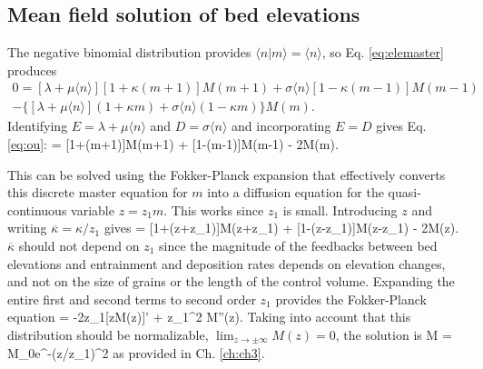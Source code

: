 \subsection{Mean field solution of bed elevations}
\label{sec:drr}
The negative binomial distribution provides $\langle n |m \rangle = \langle n \rangle$, so Eq. \ref{eq:elemaster} produces
\begin{multline} 0 = [\lambda + \mu \langle n \rangle][1+\kappa(m+1)]M(m+1) + \sigma \langle n \rangle [1-\kappa(m-1)]M(m-1) \\- \{[\lambda + \mu \langle n \rangle](1+\kappa m) + \sigma \langle n \rangle (1-\kappa m) \}M(m). \end{multline}
Identifying $E=\lambda + \mu \langle n \rangle$ and $D = \sigma \langle n \rangle$ and incorporating $E=D$ gives Eq. \ref{eq:ou}:
 = [1+\kappa(m+1)]M(m+1) + [1-\kappa(m-1)]M(m-1) - 2M(m).\ee

This can be solved using the Fokker-Planck expansion \citep{Gardiner1983} that effectively converts this discrete master equation for $m$ into a diffusion equation for the quasi-continuous variable $z=z_1 m$. This works since $z_1$ is small. Introducing $z$ and writing $\overline{\kappa}=\kappa/z_1$ gives
 = [1+\overline{\kappa}(z+z_1)]M(z+z_1) + [1-\overline{\kappa}(z-z_1)]M(z-z_1) - 2M(z).\ee
$\overline{\kappa}$ should not depend on $z_1$ since the magnitude of the feedbacks between bed elevations and entrainment and deposition rates depends on elevation changes, and not on the size of grains or the length of the control volume.
Expanding the entire first and second terms to second order $z_1$ provides the Fokker-Planck equation
 = -2\overline{\kappa}z_1[zM(z)]' + z_1^2 M''(z). \ee
Taking into account that this distribution should be normalizable, \newline $\lim_{z\rightarrow \pm \infty}M(z) = 0$, the solution is
\be M = M_0e^{-\kappa (z/z_1)^2}\ee
as provided in Ch. \ref{ch:ch3}.


